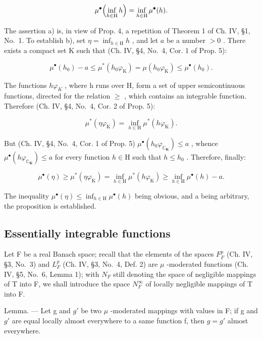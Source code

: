 \[
\mu^ {\bullet} \Bigl (\inf _ {h \in \mathrm{H}} h \Bigr) = \inf _ {h \in \mathrm{H}} \mu^ {\bullet} (h).
\]

The assertion a) is, in view of Prop. 4, a repetition of Theorem 1 of Ch. IV, §1, No.~1. To establish b), set \(\eta = \inf_{h\in \mathrm{H}}h\) , and let \(a\) be a number \(>0\) . There exists a compact set K such that (Ch. IV, §4, No.~4, Cor. 1 of Prop. 5):

\[
\mu^ {\bullet} (h _ {0}) - a \leqslant \mu^ {*} (h _ {0} \varphi_ {\mathrm{K}}) = \mu (h _ {0} \varphi_ {\mathrm{K}}) \leqslant \mu^ {\bullet} (h _ {0}).
\]

The functions \(h\varphi_{K}\) , where h runs over H, form a set of upper semicontinuous functions, directed for the relation \(\geqslant\) , which contains an integrable function. Therefore (Ch. IV, §4, No.~4, Cor. 2 of Prop. 5):

\[
\mu^ {*} (\eta \varphi_ {\mathrm{K}}) = \inf _ {h \in \mathrm{H}} \mu^ {*} (h \varphi_ {\mathrm{K}}).
\]

But (Ch. IV, §4, No.~4, Cor. 1 of Prop. 5) \(\mu^{\bullet}(h_{0}\varphi_{\mathbb{C}_{\mathbf{K}}}) \leqslant a\) , whence \(\mu^{\bullet}(h\varphi_{\mathbb{C}_{\mathbf{K}}}) \leqslant a\) for every function \(h \in \mathrm{H}\) such that \(h \leqslant h_{0}\) . Therefore, finally:

\[
\mu^ {\bullet} (\eta) \geqslant \mu^ {*} (\eta \varphi_ {\mathrm{K}}) = \inf _ {h \in \mathrm{H}} \mu^ {*} (h \varphi_ {\mathrm{K}}) \geqslant \inf _ {h \in \mathrm{H}} \mu^ {\bullet} (h) - a.
\]

The inequality \(\mu^{\bullet}(\eta) \leqslant \inf_{h \in \mathrm{H}} \mu^{\bullet}(h)\) being obvious, and a being arbitrary, the proposition is established.

\subsection{Essentially integrable functions}

Let F be a real Banach space; recall that the elements of the spaces \(F_{F}^{p}\) (Ch. IV, §3, No.~3) and \(L_{F}^{p}\) (Ch. IV, §3, No.~4, Def. 2) are \(\mu\) -moderated functions (Ch. IV, §5, No.~6, Lemma 1); with \(N_{F}\) still denoting the space of negligible mappings of T into F, we shall introduce the space \(N_{F}^{\infty}\) of locally negligible mappings of T into F.

Lemma. --- Let g and \(g'\) be two \(\mu\) -moderated mappings with values in F; if g and \(g'\) are equal locally almost everywhere to a same function f, then \(g = g'\) almost everywhere.

